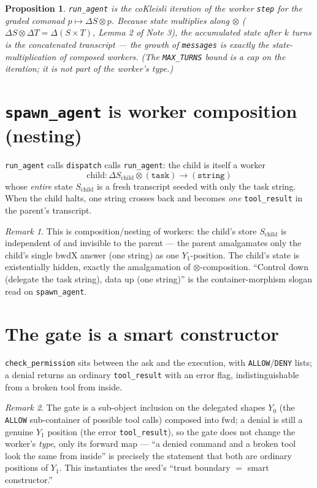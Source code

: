 \documentclass[11pt]{article}
\theoremstyle{plain}
\newtheorem{proposition}{Proposition}
\theoremstyle{definition}
\theoremstyle{remark}
\newtheorem{remark}{Remark}
\newcommand{\state}{\Delta}
\begin{document}
\begin{proposition}
\texttt{run\_agent} is the coKleisli iteration of the worker \texttt{step} for the graded
comonad $p \mapsto \state S \otimes p$. Because state multiplies along $\otimes$
($\state S \otimes \state T = \state(S \times T)$, Lemma 2 of Note 3), the accumulated state
after $k$ turns is the \emph{concatenated} transcript --- the growth of \texttt{messages} is
exactly the state-multiplication of composed workers. (The \texttt{MAX\_TURNS} bound is a cap
on the iteration; it is not part of the worker's type.)
\end{proposition}

\section{\texorpdfstring{\texttt{spawn\_agent}}{spawn\_agent} is worker composition (nesting)}

\texttt{run\_agent} calls \texttt{dispatch} calls \texttt{run\_agent}: the child is itself a
worker
\[
  \mathrm{child} : \state S_{\mathrm{child}} \otimes (\texttt{task}) \longrightarrow (\texttt{string})
\]
whose \emph{entire} state $S_{\mathrm{child}}$ is a fresh transcript seeded with only the task
string. When the child halts, one string crosses back and becomes \emph{one}
\texttt{tool\_result} in the parent's transcript.

\begin{remark}
This is composition/nesting of workers: the child's store $S_{\mathrm{child}}$ is independent
of and invisible to the parent --- the parent amalgamates only the child's single
$\mathrm{bwdX}$ answer (one string) as one $Y_1$-position. The child's state is existentially
hidden, exactly the amalgamation of $\otimes$-composition. ``Control down (delegate the task
string), data up (one string)'' is the container-morphism slogan read on \texttt{spawn\_agent}.
\end{remark}

\section{The gate is a smart constructor}

\texttt{check\_permission} sits between the ask and the execution, with
\texttt{ALLOW}/\texttt{DENY} lists; a denial returns an ordinary \texttt{tool\_result} with an
error flag, indistinguishable from a broken tool from inside.

\begin{remark}
The gate is a sub-object inclusion on the delegated shapes $Y_0$ (the \texttt{ALLOW}
sub-container of possible tool calls) composed into $\mathrm{fwd}$; a denial is still a
genuine $Y_1$ position (the error \texttt{tool\_result}), so the gate does not change the
worker's \emph{type}, only its forward map --- ``a denied command and a broken tool look the
same from inside'' is precisely the statement that both are ordinary positions of $Y_1$. This
instantiates the seed's ``trust boundary $=$ smart constructor.''
\end{remark}
\end{document}
